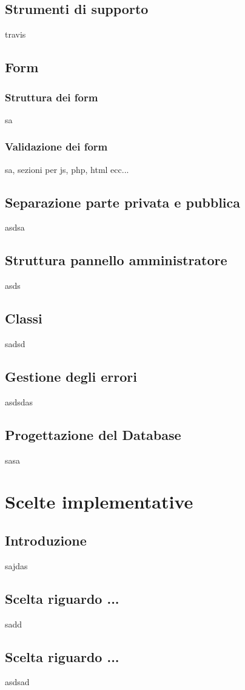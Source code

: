 \documentclass[12pt]{article}
\begin{document}
	\subsection{Strumenti di supporto}
	travis
	\subsection{Form}
	\subsubsection{Struttura dei form}
	sa
	\subsubsection{Validazione dei form}
	sa, sezioni per js, php, html ecc...
	\subsection{Separazione parte privata e pubblica}
	asdsa
	\subsection{Struttura pannello amministratore}
	asds
	\subsection{Classi}
	sadsd
	\subsection{Gestione degli errori}
	asdsdas
	\subsection{Progettazione del Database}
	sasa
	
	\section{Scelte implementative}
	\subsection{Introduzione}
	sajdas
	\subsection{Scelta riguardo ...}
	sadd
	\subsection{Scelta riguardo ...}
	asdsad
	
\end{document}
